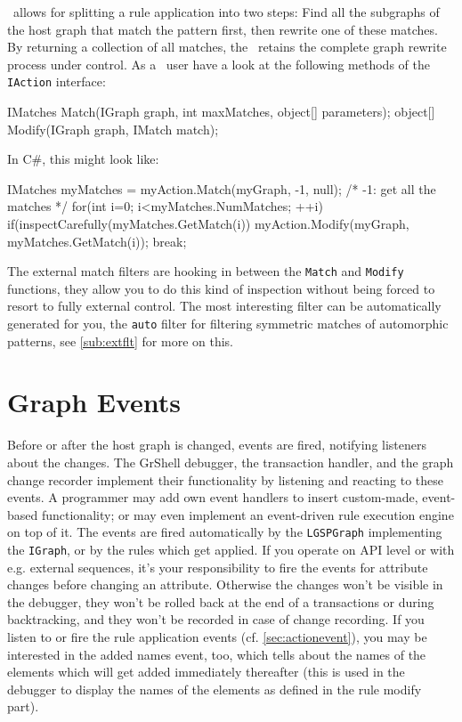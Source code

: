 \begin{note}\label{note:inspect}
\LibGr\ allows for splitting a rule application into two steps:
Find all the subgraphs of the host graph that match the pattern first, then rewrite one of these matches. 
By returning a collection of all matches, the \LibGr\ retains the complete graph rewrite process under control.
As a \LibGr\ user have a look at the following methods of the \texttt{IAction} interface:
\begin{csharplet}
IMatches Match(IGraph graph, int maxMatches, object[] parameters);
object[] Modify(IGraph graph, IMatch match);
\end{csharplet}

In C\#, this might look like:
\begin{csharplet}
IMatches myMatches = myAction.Match(myGraph, -1, null); /* -1: get all the matches */
for(int i=0; i<myMatches.NumMatches; ++i)
{
	if(inspectCarefully(myMatches.GetMatch(i))
	{
		myAction.Modify(myGraph, myMatches.GetMatch(i));
		break;
  	}
}
\end{csharplet}

The external match filters are hooking in between the \texttt{Match} and \texttt{Modify} functions, they allow you to do this kind of inspection without being forced to resort to fully external control.
The most interesting filter can be automatically generated for you, the \texttt{auto} filter for filtering symmetric matches of automorphic patterns, see \ref{sub:extflt} for more on this.
\end{note}


\section{Graph Events}\label{sec:graphevent}

Before or after the host graph is changed, events are fired, notifying listeners about the changes.
The GrShell debugger, the transaction handler, and the graph change recorder implement their functionality by listening and reacting to these events.
A programmer may add own event handlers to insert custom-made, event-based functionality;
or may even implement an event-driven rule execution engine on top of it.
The events are fired automatically by the \texttt{LGSPGraph} implementing the \texttt{IGraph},
or by the rules which get applied.
If you operate on API level or with e.g. external sequences, it's your responsibility to fire the events for attribute changes before changing an attribute.
Otherwise the changes won't be visible in the debugger, they won't be rolled back at the end of a transactions or during backtracking, and they won't be recorded in case of change recording.
If you listen to or fire the rule application events (cf. \ref{sec:actionevent}), you may be interested in the added names event, too, which tells about the names of the elements which will get added immediately thereafter (this is used in the debugger to display the names of the elements as defined in the rule modify part).

